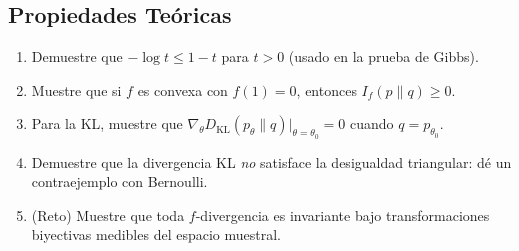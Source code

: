 \subsection*{Propiedades Teóricas}
\begin{enumerate}[resume]
	\item Demuestre que $-\log t \le 1 - t$ para $t > 0$ (usado en la prueba de Gibbs).
	\item Muestre que si $f$ es convexa con $f(1)=0$, entonces $I_f(p \| q) \ge 0$.
	\item Para la KL, muestre que $\nabla_\theta D_{\mathrm{KL}}(p_\theta \| q) \big|_{\theta=\theta_0} = 0$ cuando $q = p_{\theta_0}$.
	\item Demuestre que la divergencia KL \emph{no} satisface la desigualdad triangular: dé un contraejemplo con Bernoulli.
	\item (Reto) Muestre que toda $f$-divergencia es invariante bajo transformaciones biyectivas medibles del espacio muestral.
\end{enumerate}

